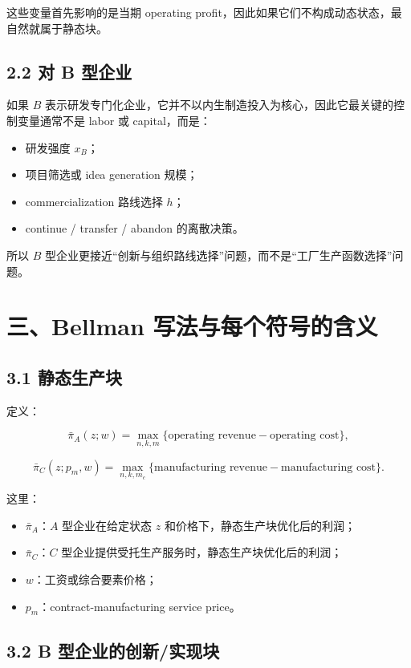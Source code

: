 \documentclass[12pt,fontset=none]{ctexart}
\begin{document}
这些变量首先影响的是当期 operating profit，因此如果它们不构成动态状态，最自然就属于静态块。

\subsection{2.2 对 B 型企业}

如果 \(B\) 表示研发专门化企业，它并不以内生制造投入为核心，因此它最关键的控制变量通常不是 labor 或 capital，而是：

\begin{itemize}[leftmargin=2em]
    \item 研发强度 \(x_B\)；
    \item 项目筛选或 idea generation 规模；
    \item commercialization 路线选择 \(h\)；
    \item continue / transfer / abandon 的离散决策。
\end{itemize}

所以 \(B\) 型企业更接近“创新与组织路线选择”问题，而不是“工厂生产函数选择”问题。

\section{三、Bellman 写法与每个符号的含义}

\subsection{3.1 静态生产块}

定义：

\[
\bar{\pi}_A(z;w)
=
\max_{n,k,m}
\{\text{operating revenue}-\text{operating cost}\},
\]

\[
\bar{\pi}_C(z;p_m,w)
=
\max_{n,k,m_c}
\{\text{manufacturing revenue}-\text{manufacturing cost}\}.
\]

这里：

\begin{itemize}[leftmargin=2em]
    \item \(\bar{\pi}_A\)：\(A\) 型企业在给定状态 \(z\) 和价格下，静态生产块优化后的利润；
    \item \(\bar{\pi}_C\)：\(C\) 型企业提供受托生产服务时，静态生产块优化后的利润；
    \item \(w\)：工资或综合要素价格；
    \item \(p_m\)：contract-manufacturing service price。
\end{itemize}

\subsection{3.2 B 型企业的创新/实现块}
\end{document}
